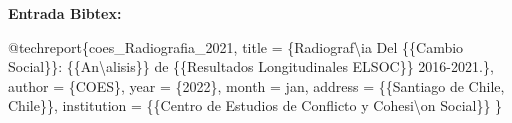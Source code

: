 \documentclass[
  12pt,
]{book}
\newenvironment{Shaded}{\begin{snugshade}}{\end{snugshade}}
\newcommand{\NormalTok}[1]{#1}
\newcommand{\OtherTok}[1]{\textcolor[rgb]{0.56,0.35,0.01}{#1}}
\newcommand{\SpecialCharTok}[1]{\textcolor[rgb]{0.00,0.00,0.00}{#1}}
\newcommand{\StringTok}[1]{\textcolor[rgb]{0.31,0.60,0.02}{#1}}
\begin{document}
\textbf{Entrada Bibtex:}

\begin{Shaded}
\begin{Highlighting}[]
\SpecialCharTok{@}\NormalTok{techreport\{coes\_Radiografia\_2021,}
\NormalTok{  title }\OtherTok{=}\NormalTok{ \{Radiograf\textbackslash{}}\StringTok{\textquotesingle{}ia Del \{\{Cambio Social\}\}: \{\{An}\SpecialCharTok{\textbackslash{}\textquotesingle{}}\StringTok{alisis\}\} de \{\{Resultados Longitudinales ELSOC\}\} 2016{-}2021.\},}
\StringTok{  author = \{COES\},}
\StringTok{  year = \{2022\},}
\StringTok{  month = jan,}
\StringTok{  address = \{\{Santiago de Chile, Chile\}\},}
\StringTok{  institution = \{\{Centro de Estudios de Conflicto y Cohesi}\SpecialCharTok{\textbackslash{}\textquotesingle{}}\StringTok{on Social\}\}}
\StringTok{\}}
\end{Highlighting}
\end{Shaded}
\end{document}
